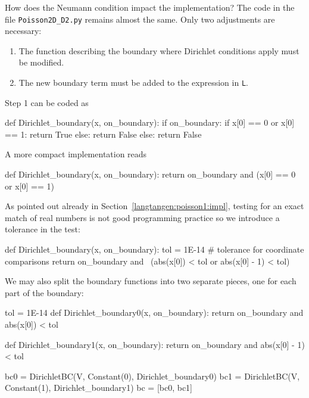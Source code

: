 How does the Neumann condition impact the implementation?
The code in the file {\fontsize{10pt}{10pt}\verb!Poisson2D_D2.py!} remains almost the same.
Only two adjustments are necessary:
\begin{enumerate}
\item The function describing the boundary where Dirichlet conditions
apply must be modified.
\item The new boundary term must be added to the expression in {\fontsize{10pt}{10pt}\verb!L!}.
\end{enumerate}
Step 1 can be coded as
\begin{python}
def Dirichlet_boundary(x, on_boundary):
    if on_boundary:
        if x[0] == 0 or x[0] == 1:
            return True
        else:
            return False
    else:
        return False
\end{python}
A more compact implementation reads
\begin{python}
def Dirichlet_boundary(x, on_boundary):
    return on_boundary and (x[0] == 0 or x[0] == 1)
\end{python}
As pointed out already in Section~\ref{langtangen:poisson1:impl},
testing for an exact match of real numbers is
not good programming practice so we introduce a tolerance in the test:
\begin{python}
def Dirichlet_boundary(x, on_boundary):
    tol = 1E-14   # tolerance for coordinate comparisons
    return on_boundary and \
           (abs(x[0]) < tol or abs(x[0] - 1) < tol)
\end{python}
We may also split the boundary functions into two separate pieces, one
for each part of the boundary:
\begin{python}
tol = 1E-14
def Dirichlet_boundary0(x, on_boundary):
    return on_boundary and abs(x[0]) < tol

def Dirichlet_boundary1(x, on_boundary):
    return on_boundary and abs(x[0] - 1) < tol

bc0 = DirichletBC(V, Constant(0), Dirichlet_boundary0)
bc1 = DirichletBC(V, Constant(1), Dirichlet_boundary1)
bc = [bc0, bc1]
\end{python}




